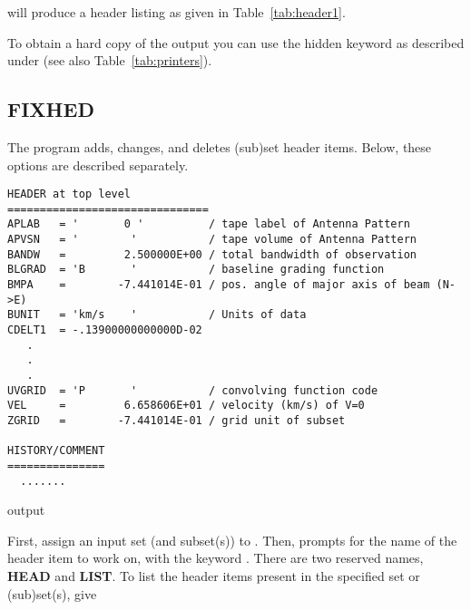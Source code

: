 
will produce a header listing as given in Table~\ref{tab:header1}.

To obtain a hard copy of the output you can use the hidden keyword
 as described under  (see also
Table~\ref{tab:printers}). 

\subsection*{FIXHED}

The program  adds, changes, and deletes (sub)set header
items.  Below, these options are described separately. 

\begin{table}[tbh]
\begin{center}
\begin{verbatim} 
HEADER at top level 
===============================
APLAB   = '       0 '          / tape label of Antenna Pattern                  
APVSN   = '        '           / tape volume of Antenna Pattern                 
BANDW   =         2.500000E+00 / total bandwidth of observation                 
BLGRAD  = 'B       '           / baseline grading function                      
BMPA    =        -7.441014E-01 / pos. angle of major axis of beam (N->E)        
BUNIT   = 'km/s    '           / Units of data                                  
CDELT1  = -.13900000000000D-02                                                  
   .
   .
   .
UVGRID  = 'P       '           / convolving function code                       
VEL     =         6.658606E+01 / velocity (km/s) of V=0                         
ZGRID   =        -7.441014E-01 / grid unit of subset                            
 
HISTORY/COMMENT
===============
  .......
\end{verbatim}
\pagebreak
\caption{ output}
\label{tab:fixhed1}

\end{center}
\end{table}

First, assign an input set (and subset(s)) to .  Then,
 prompts for the name of the header item to work on,
with the keyword .  There are two reserved names, {\bf HEAD}
and {\bf LIST}.  To list the header items present in the specified set or
(sub)set(s), give


